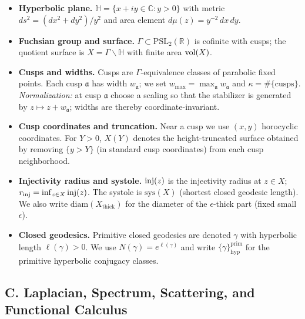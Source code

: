 \begin{itemize}
  \item \textbf{Hyperbolic plane.} $\mathbb{H}=\{x+iy\in\mathbb{C}:y>0\}$ with metric $ds^2=(dx^2+dy^2)/y^2$ and area element $d\mu(z)=y^{-2}\,dx\,dy$.
  \item \textbf{Fuchsian group and surface.} $\Gamma\subset \mathrm{PSL}_2(\mathbb{R})$ is cofinite with cusps; the quotient surface is $X=\Gamma\backslash\mathbb{H}$ with finite area $\operatorname{vol}(X)$.
  \item \textbf{Cusps and widths.} Cusps are $\Gamma$-equivalence classes of parabolic fixed points. Each cusp $\mathfrak{a}$ has width $w_\mathfrak{a}$;
        we set $w_{\max}=\max_\mathfrak{a}w_\mathfrak{a}$ and $\kappa=\#\{\text{cusps}\}$.
        \emph{Normalization:} at cusp $\mathfrak{a}$ choose a scaling so that the stabilizer is generated by $z\mapsto z+w_\mathfrak{a}$; widths are thereby coordinate-invariant.
  \item \textbf{Cusp coordinates and truncation.} Near a cusp we use $(x,y)$ horocyclic coordinates. For $Y>0$, $X(Y)$ denotes the height-truncated surface obtained by removing $\{y>Y\}$ (in standard cusp coordinates) from each cusp neighborhood.
  \item \textbf{Injectivity radius and systole.} $\operatorname{inj}(z)$ is the injectivity radius at $z\in X$; $r_{\mathrm{inj}}=\inf_{z\in X}\operatorname{inj}(z)$. The systole is $\mathrm{sys}(X)$ (shortest closed geodesic length).
        We also write $\mathrm{diam}(X_{\mathrm{thick}})$ for the diameter of the $\epsilon$-thick part (fixed small $\epsilon$).
  \item \textbf{Closed geodesics.} Primitive closed geodesics are denoted $\gamma$ with hyperbolic length $\ell(\gamma)>0$.
        We use $N(\gamma)=e^{\ell(\gamma)}$ and write $\{\gamma\}^{\mathrm{prim}}_{\mathrm{hyp}}$ for the primitive hyperbolic conjugacy classes.
\end{itemize}

\subsection*{C. Laplacian, Spectrum, Scattering, and Functional Calculus}

